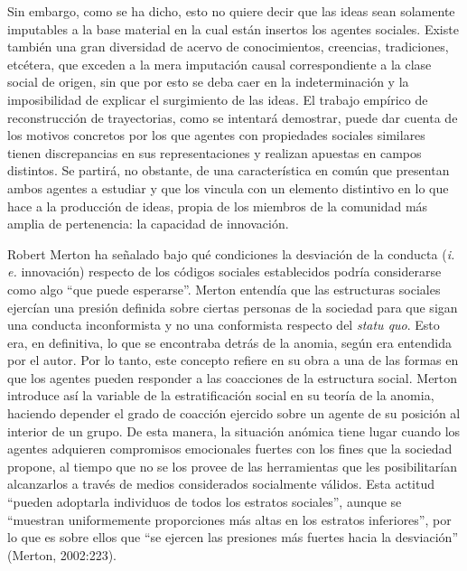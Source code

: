Sin embargo, como se ha dicho, esto no quiere decir que las ideas sean solamente imputables a la base material en la cual están insertos los agentes sociales. Existe también una gran diversidad de acervo de conocimientos, creencias, tradiciones, etcétera, que exceden a la mera imputación causal correspondiente a la clase social de origen, sin que por esto se deba caer en la indeterminación y la imposibilidad de explicar el surgimiento de las ideas. El trabajo empírico de reconstrucción de trayectorias, como se intentará demostrar, puede dar cuenta de los motivos concretos por los que agentes con propiedades sociales similares tienen discrepancias en sus representaciones y realizan apuestas en campos distintos. Se partirá, no obstante, de una característica en común que presentan ambos agentes a estudiar y que los vincula con un elemento distintivo en lo que hace a la producción de ideas, propia de los miembros de la comunidad más amplia de pertenencia: la capacidad de innovación.

Robert Merton ha señalado bajo qué condiciones la desviación de la conducta (\emph{i. e.} innovación) respecto de los códigos sociales establecidos podría considerarse como algo \enquote{que puede esperarse}. Merton entendía que las estructuras sociales ejercían una presión definida sobre ciertas personas de la sociedad para que sigan una conducta inconformista y no una conformista respecto del \emph{statu quo}. Esto era, en definitiva, lo que se encontraba detrás de la anomia, según era entendida por el autor. Por lo tanto, este concepto refiere en su obra a una de las formas en que los agentes pueden responder a las coacciones de la estructura social. Merton introduce así la variable de la estratificación social en su teoría de la anomia, haciendo depender el grado de coacción ejercido sobre un agente de su posición al interior de un grupo. De esta manera, la situación anómica tiene lugar cuando los agentes adquieren compromisos emocionales fuertes con los fines que la sociedad propone, al tiempo que no se los provee de las herramientas que les posibilitarían alcanzarlos a través de medios considerados socialmente válidos. Esta actitud \enquote{pueden adoptarla individuos de todos los estratos sociales}, aunque se \enquote{muestran uniformemente proporciones más altas en los estratos inferiores}, por lo que es sobre ellos que \enquote{se ejercen las presiones más fuertes hacia la desviación} (Merton, 2002:223).

